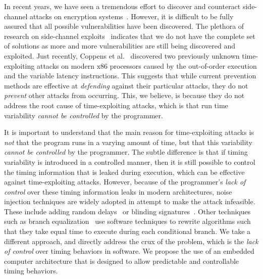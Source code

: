 
In recent years, we have seen a tremendous effort to discover and counteract side-channel attacks on encryption systems~\cite{biham97differential,2009-x86timing,99designprinciples,fbscc,branchpredict,Kelsey98sidechannel,blindingrsa,cachepartition,sidechannelprocarch}.
However, it is difficult to be fully assured that all possible vulnerabilities  have been discovered.
The plethora of research on side-channel exploits~\cite{2009-x86timing,biham97differential,99designprinciples,fbscc,branchpredict,Kelsey98sidechannel,blindingrsa,cachepartition,sidechannelprocarch} indicates that we do not have the complete set of solutions as more and more vulnerabilities are still being discovered and exploited.
Just recently, Coppens et al.~\cite{2009-x86timing} discovered two previously unknown time-exploiting attacks on modern x86 processors caused by the out-of-order execution and the variable latency instructions.
This suggests that while current prevention methods are effective at \textit{defending} against their particular attacks, they do not \textit{prevent} other attacks from occurring.
This, we believe, is because they do not address the root cause of time-exploiting attacks, which is that run time variability \textit{cannot be controlled} by the programmer.

It is important to understand that the main reason for time-exploiting attacks is \textit{not} that the program runs in a varying amount of time, but that this variability \textit{cannot be controlled} by the programmer. 
The subtle difference is that if timing variability is introduced in a controlled manner, then it is still possible to control the timing information that is leaked during execution, which can be effective against time-exploiting attacks. 
However, because of the programmer's \textit{lack of control} over these timing information leaks in modern architectures, noise injection techniques are widely adopted in attempt to make the attack infeasible.
These include adding random delays~\cite{Kocher96timingattacks} or blinding signatures~\cite{Kocher96timingattacks,blindingrsa}. 
Other techniques such as branch equalization~\cite{Molnar05theprogram,SCAsurvey} use software techniques to rewrite algorithms such that they take equal time to execute during each conditional branch. 
We take a different approach, and  directly address the crux of the problem, which is the \textit{lack of control} over timing behaviors in software. 
We propose the use of an embedded computer architecture that is designed to allow predictable and controllable timing behaviors.

